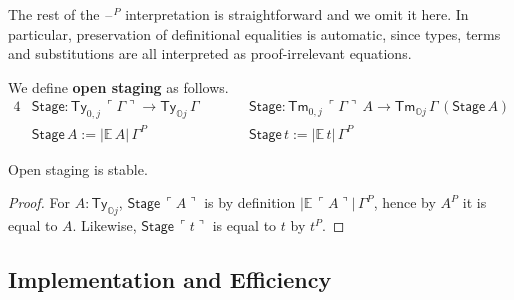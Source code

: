\documentclass[acmsmall]{acmart}
\newcommand{\msf}[1]{\mathsf{#1}}
\newcommand{\mbb}[1]{\mathbb{#1}}
\newcommand{\mbbo}{\mbb{O}}
\newcommand{\Ty}{\msf{Ty}}
\newcommand{\Tm}{\msf{Tm}}
\newcommand{\blank}{{\mathord{\hspace{1pt}\text{--}\hspace{1pt}}}}
\newcommand{\emb}[1]{\ulcorner#1\urcorner}
\newcommand{\Stage}{\msf{Stage}}
\newcommand{\ev}{\mbb{E}}
\theoremstyle{remark}
\begin{document}
The rest of the $\blank^P$ interpretation is straightforward and we omit it
here. In particular, preservation of definitional equalities is automatic, since
types, terms and substitutions are all interpreted as proof-irrelevant
equations.

\begin{definition} We define \textbf{open staging} as follows.
\begin{alignat*}{4}
  & \Stage : \Ty_{0,j}\,\emb{\Gamma} \to \Ty_{\mbbo j}\,\Gamma \hspace{2em} && \Stage : \Tm_{0,j}\,\emb{\Gamma}\,A \to \Tm_{\mbbo j}\,\Gamma\,(\Stage\,A) \\
  & \Stage\,A := |\ev\,A|\,\Gamma^P && \Stage\,t := |\ev\,t|\,\Gamma^P
\end{alignat*}
\end{definition}

\begin{theorem} Open staging is stable.
\end{theorem}
\begin{proof} For $A : \Ty_{\mbbo j}$, $\Stage\,\emb{A}$ is by definition $|\ev\,\emb{A}|\,\Gamma^P$,
  hence by $A^P$ it is equal to $A$. Likewise, $\Stage\,\emb{t}$ is equal to $t$ by $t^P$.
\end{proof}

\subsection{Implementation and Efficiency}
\end{document}
